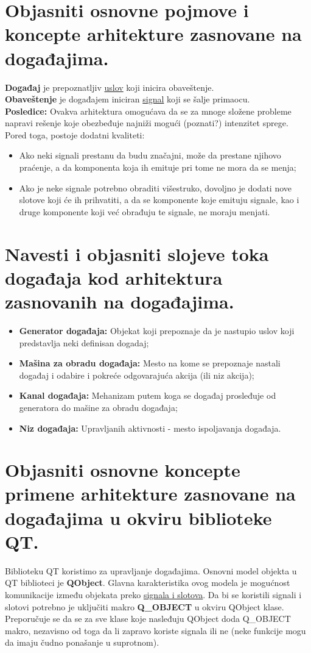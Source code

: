 \documentclass[a4paper]{article}
\begin{document}
\section{Objasniti osnovne pojmove i koncepte arhitekture zasnovane na događajima.}
  \noindent \textbf{Događaj} je prepoznatljiv \underline{uslov} koji inicira obaveštenje.\\
  \textbf{Obaveštenje} je događajem iniciran \underline{signal} koji se šalje primaocu.\\
  \textbf{Posledice:} Ovakva arhitektura omogućava da se za mnoge složene probleme napravi 
  rešenje koje obezbeđuje najniži mogući (poznati?) intenzitet sprege. 
  Pored toga, postoje dodatni kvaliteti:
  \begin{itemize}
    \item Ako neki signali prestanu da budu značajni, može da prestane njihovo praćenje, 
          a da komponenta koja ih emituje pri tome ne mora da se menja;
    \item Ako je neke signale potrebno obraditi višestruko, 
          dovoljno je dodati nove slotove koji će ih prihvatiti, a da se komponente koje 
          emituju signale, kao i druge komponente koji već obrađuju te signale, ne moraju menjati.
  \end{itemize}

\section{Navesti i objasniti slojeve toka događaja kod arhitektura zasnovanih na događajima.}
  \begin{itemize}
    \item \textbf{Generator događaja:} Objekat koji prepoznaje da je nastupio uslov koji 
          predstavlja neki definisan dogadaj;
    \item \textbf{Mašina za obradu događaja:} Mesto na kome se prepoznaje nastali događaj 
          i odabire i pokreće odgovarajuća akcija (ili niz akcija);
    \item \textbf{Kanal događaja:} Mehanizam putem koga se događaj prosleđuje od generatora 
          do mašine za obradu događaja;
    \item \textbf{Niz događaja:} Upravljanih aktivnosti - mesto ispoljavanja događaja.
  \end{itemize}

\section{Objasniti osnovne koncepte primene arhitekture zasnovane na događajima u okviru biblioteke QT.}
  Biblioteku QT koristimo za upravljanje događajima. Osnovni model objekta u QT biblioteci je 
  \textbf{QObject}. Glavna karakteristika ovog modela je mogućnost komunikacije između objekata preko
  \underline{signala i slotova}. Da bi se koristili signali i slotovi potrebno je uključiti makro
  \textbf{Q\_OBJECT} u okviru QObject klase. Preporučuje se da se za sve klase koje nasleđuju QObject 
  doda Q\_OBJECT makro, nezavisno od toga da li zapravo koriste signala ili ne (neke funkcije mogu
  da imaju čudno ponašanje u suprotnom). 
\end{document}
